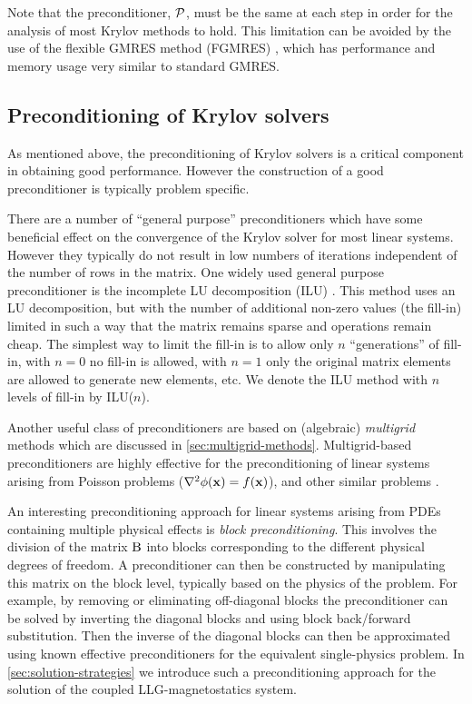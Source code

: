 Note that the preconditioner, $\mathcal{P}$, must be the same at each step in order for the analysis of most Krylov methods to hold.
This limitation can be avoided by the use of the flexible GMRES method (FGMRES) \cite{Saad1993}, which has performance and memory usage very similar to standard GMRES.


\subsection{Preconditioning of Krylov solvers}
\label{sec:preconditioners}

As mentioned above, the preconditioning of Krylov solvers is a critical component in obtaining good performance.
However the construction of a good preconditioner is typically problem specific.

There are a number of ``general purpose'' preconditioners which have some beneficial effect on the convergence of the Krylov solver for most linear systems.
However they typically do not result in low numbers of iterations independent of the number of rows in the matrix.
One widely used general purpose preconditioner is the incomplete LU decomposition (ILU) \cite[287]{Saad2000}.
This method uses an LU decomposition, but with the number of additional non-zero values (the fill-in) limited in such a way that the matrix remains sparse and operations remain cheap.
The simplest way to limit the fill-in is to allow only $n$ ``generations'' of fill-in, \ie with $n=0$ no fill-in is allowed, with $n=1$ only the original matrix elements are allowed to generate new elements, etc.
We denote the ILU method with $n$ levels of fill-in by ILU($n$).

Another useful class of preconditioners are based on (algebraic) \emph{multigrid} methods which are discussed in \cref{sec:multigrid-methods}.
Multigrid-based preconditioners are highly effective for the preconditioning of linear systems arising from Poisson problems (\ie $\nabla^2 \phi(\boldsymbol{\mathrm{x}}) = f(\boldsymbol{\mathrm{x}})$), and other similar problems \cite{Henson2002}.

An interesting preconditioning approach for linear systems arising from PDEs containing multiple physical effects is \emph{block preconditioning}.
This involves the division of the matrix $\mathrm{B}$ into blocks corresponding to the different physical degrees of freedom.
A preconditioner can then be constructed by manipulating this matrix on the block level, typically based on the physics of the problem.
For example, by removing or eliminating off-diagonal blocks the preconditioner can be solved by inverting the diagonal blocks and using block back/forward substitution.
Then the inverse of the diagonal blocks can then be approximated using known effective preconditioners for the equivalent single-physics problem.
In \cref{sec:solution-strategies} we introduce such a preconditioning approach for the solution of the coupled LLG-magnetostatics system.



